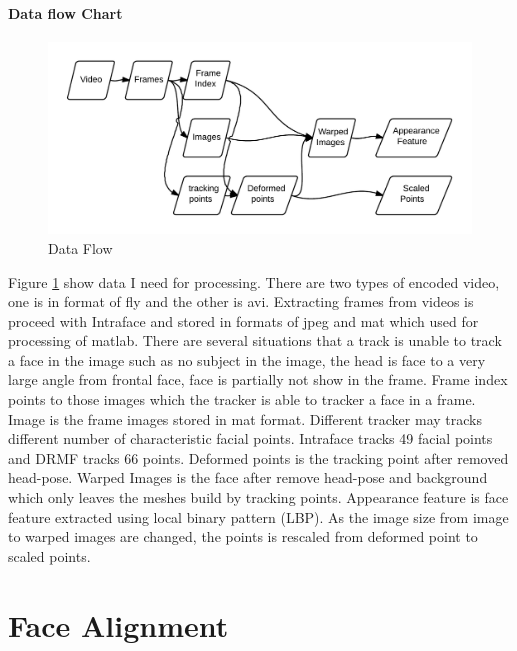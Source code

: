 \paragraph{Data flow Chart}
\begin{figure}[ht]
\centering
\includegraphics[width=\textwidth]{imgs/DataFlowChart.png}
\caption{Data Flow}
\label{fig:DF}
\end{figure}
Figure \ref{fig:DF} show data I need for processing. There are two types of encoded video, one is in format of fly and the other is avi. Extracting frames from videos is proceed with Intraface and stored in formats of jpeg and mat which used for processing of matlab. There are several situations that a track is unable to track a face in the image such as no subject in the image, the head is face to a very large angle from frontal face, face is partially not show in the frame. Frame index points to those images which the tracker is able to tracker a face in a frame. Image is the frame images stored in mat format. Different tracker may tracks different number of characteristic facial points. Intraface tracks 49 facial points and DRMF tracks 66 points. Deformed points is the tracking point after removed head-pose. Warped Images is the face after remove head-pose and background which only leaves the meshes build by tracking points. Appearance feature is face feature extracted using local binary pattern (LBP). As the image size from image to warped images are changed, the points is rescaled from deformed point to scaled points.

\section{Face Alignment}

